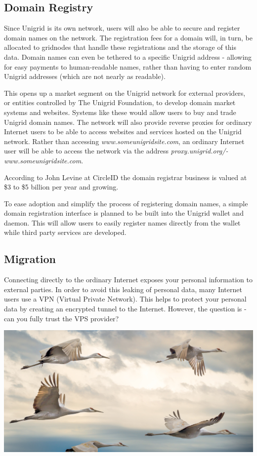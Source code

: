 \documentclass[a4paper,oneside]{article}
\begin{document}
\subsection{Domain Registry}
Since Unigrid is its own network, users will also be able to secure and register domain names on the network. The registration fees for a domain will, in turn, be allocated to gridnodes that handle these registrations and the storage of this data. Domain names can even be tethered to a specific Unigrid address - allowing for easy payments to human-readable names, rather than having to enter random Unigrid addresses (which are not nearly as readable).

This opens up a market segment on the Unigrid network for external providers, or entities controlled by The Unigrid Foundation, to develop domain market systems and websites. Systems like these would allow users to buy and trade Unigrid domain names. The network will also provide reverse proxies for ordinary Internet users to be able to access websites and services hosted on the Unigrid network. Rather than accessing \emph{www.someunigridsite.com}, an ordinary Internet user will be able to access the network via the address \emph{proxy.unigrid.org/- www.someunigridsite.com}.

According to John Levine at CircleID \cite{john2018} the domain registrar business is valued at \$3 to \$5 billion per year and growing.

To ease adoption and simplify the process of registering domain names, a simple domain registration interface is planned to be built into the Unigrid wallet and daemon. This will allow users to easily register names directly from the wallet while third party services are developed.

\subsection{Migration}
Connecting directly to the ordinary Internet exposes your personal information to external parties. In order to avoid this leaking of personal data, many Internet users use a VPN (Virtual Private Network). This helps to protect your personal data by creating an encrypted tunnel to the Internet. However, the question is - can you fully trust the VPS provider?

\vspace{0.05cm}
\begin{mdframed}[style=textimage]
	\includegraphics[width=381pt]{migration}
\end{mdframed}
\end{document}
